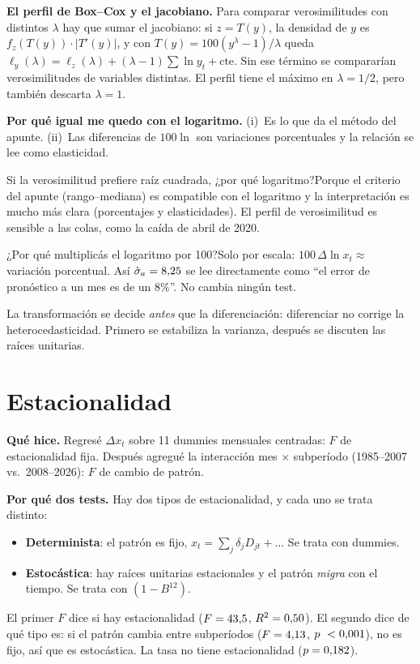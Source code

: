 \documentclass[11pt,a4paper]{article}
\newcommand{\Q}[2]{\begin{pregunta}{#1}#2\end{pregunta}}
\begin{document}
\textbf{El perfil de Box--Cox y el jacobiano.} Para comparar verosimilitudes con distintos $\lambda$ hay que sumar el jacobiano: si $z=T(y)$, la densidad de $y$ es $f_z(T(y))\cdot|T'(y)|$, y con $T(y)=100(y^\lambda-1)/\lambda$ queda $\ell_y(\lambda)=\ell_z(\lambda)+(\lambda-1)\sum\ln y_t+\text{cte}$. Sin ese t\'ermino se comparar\'ian verosimilitudes de variables distintas. El perfil tiene el m\'aximo en $\lambda=1/2$, pero tambi\'en descarta $\lambda=1$.

\textbf{Por qu\'e igual me quedo con el logaritmo.} (i)~Es lo que da el m\'etodo del apunte. (ii)~Las diferencias de $100\ln$ son variaciones porcentuales y la relaci\'on se lee como elasticidad.

\Q{Si la verosimilitud prefiere ra\'iz cuadrada, ¿por qu\'e logaritmo?}{Porque el criterio del apunte (rango--mediana) es compatible con el logaritmo y la interpretaci\'on es mucho m\'as clara (porcentajes y elasticidades). El perfil de verosimilitud es sensible a las colas, como la ca\'ida de abril de 2020.}

\Q{¿Por qu\'e multiplic\'as el logaritmo por 100?}{Solo por escala: $100\,\Delta\ln x_t\approx$ variaci\'on porcentual. As\'i $\hat\sigma_a=8{,}25$ se lee directamente como ``el error de pron\'ostico a un mes es de un 8\%''. No cambia ning\'un test.}

\begin{clave}La transformaci\'on se decide \emph{antes} que la diferenciaci\'on: diferenciar no corrige la heterocedasticidad. Primero se estabiliza la varianza, despu\'es se discuten las ra\'ices unitarias.\end{clave}

\section{Estacionalidad}
\textbf{Qu\'e hice.} Regres\'e $\Delta x_t$ sobre 11 dummies mensuales centradas: $F$ de estacionalidad fija. Despu\'es agregu\'e la interacci\'on mes $\times$ subper\'iodo (1985--2007 vs.\ 2008--2026): $F$ de cambio de patr\'on.

\textbf{Por qu\'e dos tests.} Hay dos tipos de estacionalidad, y cada uno se trata distinto:
\begin{itemize}
\item \textbf{Determinista}: el patr\'on es fijo, $x_t=\sum_j\delta_jD_{jt}+\dots$ Se trata con dummies.
\item \textbf{Estoc\'astica}: hay ra\'ices unitarias estacionales y el patr\'on \emph{migra} con el tiempo. Se trata con $(1-B^{12})$.
\end{itemize}
El primer $F$ dice si hay estacionalidad ($F=43{,}5$, $R^2=0{,}50$). El segundo dice de qu\'e tipo es: si el patr\'on cambia entre subper\'iodos ($F=4{,}13$, $p\ \EstPcv$), no es fijo, as\'i que es estoc\'astica. La tasa no tiene estacionalidad ($p=0{,}182$).
\end{document}
